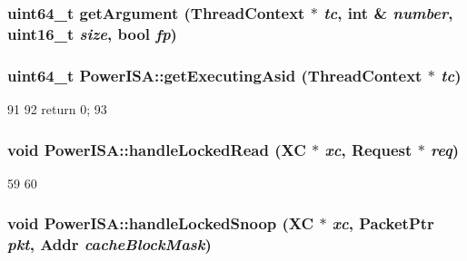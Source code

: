 \label{namespacePowerISA_ae2d645019d37ae932cad3b1435ebe638}
\hypertarget{namespacePowerISA_a3f9560369e934be05b1dd8f23fbd6104}{
\subsubsection[{getArgument}]{\setlength{\rightskip}{0pt plus 5cm}uint64\_\-t getArgument ({\bf ThreadContext} $\ast$ {\em tc}, \/  int \& {\em number}, \/  uint16\_\-t {\em size}, \/  bool {\em fp})}}
\label{namespacePowerISA_a3f9560369e934be05b1dd8f23fbd6104}
\hypertarget{namespacePowerISA_ae7c74a18f017c17c77294a09a7825d91}{
\subsubsection[{getExecutingAsid}]{\setlength{\rightskip}{0pt plus 5cm}uint64\_\-t PowerISA::getExecutingAsid ({\bf ThreadContext} $\ast$ {\em tc})}}
\label{namespacePowerISA_ae7c74a18f017c17c77294a09a7825d91}



\begin{DoxyCode}
91 {
92     return 0;
93 }
\end{DoxyCode}
\hypertarget{namespacePowerISA_ac16f0956cb4e3cb6d1bd24521a98c685}{
\subsubsection[{handleLockedRead}]{\setlength{\rightskip}{0pt plus 5cm}void PowerISA::handleLockedRead (XC $\ast$ {\em xc}, \/  {\bf Request} $\ast$ {\em req})}}
\label{namespacePowerISA_ac16f0956cb4e3cb6d1bd24521a98c685}



\begin{DoxyCode}
59 {
60 }
\end{DoxyCode}
\hypertarget{namespacePowerISA_ad52b48fd509cd387fe57295ec645bed4}{
\subsubsection[{handleLockedSnoop}]{\setlength{\rightskip}{0pt plus 5cm}void PowerISA::handleLockedSnoop (XC $\ast$ {\em xc}, \/  {\bf PacketPtr} {\em pkt}, \/  {\bf Addr} {\em cacheBlockMask})}}
\label{namespacePowerISA_ad52b48fd509cd387fe57295ec645bed4}



